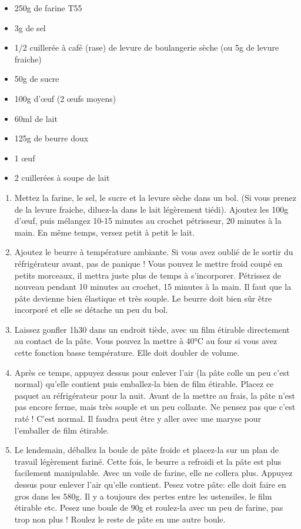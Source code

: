\bigskip
{}
{}{\begin{itemize}
	\item 250g de farine T55
	\item 3g de sel
	\item 1/2 cuillerée à café (rase) de levure de boulangerie sèche (ou 5g de levure fraiche)
	\item 50g de sucre
	\item 100g d'œuf (2 œufs moyens)
	\item 60ml de lait 
	\item 125g de beurre doux
\\
	\item 1 œuf
	\item 2 cuillerées à soupe de lait
\end{itemize}}
{\begin{enumerate}
	\item  Mettez la farine, le sel, le sucre et la levure sèche dans un bol. (Si vous prenez de la levure fraiche, diluez-la dans le lait légèrement tiédi). Ajoutez les 100g d'\oe uf, puis mélangez 10-15 minutes au crochet pétrisseur, 20 minutes à la main. En même temps, versez petit à petit le lait.
	\item Ajoutez le beurre à température ambiante. Si vous avez oublié de le sortir du réfrigérateur avant, pas de panique ! Vous pouvez le mettre froid coupé en petits morceaux, il mettra juste plus de temps à s'incorporer. Pétrissez de nouveau pendant 10 minutes au crochet, 15 minutes à la main. Il faut que la pâte devienne bien élastique et très souple. Le beurre doit bien sûr être incorporé et elle se détache un peu du bol.
	\item  Laissez gonfler 1h30 dans un endroit tiède, avec un film étirable directement au contact de la pâte. Vous pouvez la mettre à 40°C au four si vous avez cette fonction basse température. Elle doit doubler de volume. 
	\item Après ce temps, appuyez dessus pour enlever l'air (la pâte colle un peu c'est normal) qu'elle contient puis emballez-la bien de film étirable. Placez ce paquet au réfrigérateur pour la nuit. Avant de la mettre au frais, la pâte n'est pas encore ferme, mais très souple et un peu collante. Ne pensez pas que c'est raté ! C'est normal. Il faudra peut être y aller avec une maryse pour l'emballer de film étirable.
	\item  Le lendemain, déballez la boule de pâte froide et placez-la sur un plan de travail légèrement fariné. Cette fois, le beurre a refroidi et la pâte est plus facilement manipulable. Avec un voile de farine, elle ne collera plus. Appuyez dessus pour enlever l'air qu'elle contient. Pesez votre pâte: elle doit faire en gros dans les 580g. Il y a toujours des pertes entre les ustensiles, le film étirable etc. Pesez une boule de 90g et roulez-la avec un peu de farine, pas trop non plus ! Roulez le reste de pâte en une autre boule.

\end{enumerate}}
